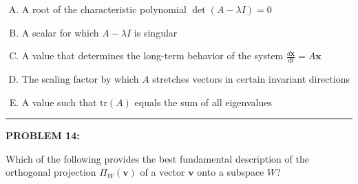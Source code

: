 \documentclass[12pt]{amsart}
\newcommand{\divider}{
  \vspace{-1em} %
  \noindent
  \raisebox{-0.15ex}{\textbullet}%
  \hspace{0.5em}%
  \rule[0.5ex]{0.95\textwidth}{1.0pt}%
  \hspace{0.5em}%
  \raisebox{-0.15ex}{\textbullet}%
  \vspace{0em} %
}
\begin{document}
\begin{enumerate}[(A)]
\item A root of the characteristic polynomial $\det(A - \lambda I) = 0$
\item A scalar for which $A - \lambda I$ is singular
\item A value that determines the long-term behavior of the system $\frac{d\mathbf{x}}{dt} = A\mathbf{x}$
\item The scaling factor by which $A$ stretches vectors in certain invariant directions
\item A value such that $\text{tr}(A)$ equals the sum of all eigenvalues
\end{enumerate}


\divider


{\bf PROBLEM 14:}

Which of the following provides the best fundamental description of the orthogonal projection $\Pi_W(\mathbf{v})$ of a vector $\mathbf{v}$ onto a subspace $W$?
\end{document}
